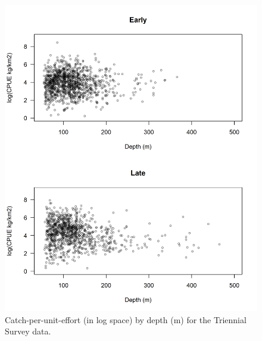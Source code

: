 \documentclass[12pt,]{article}
\begin{document}
\begin{figure}
\centering
\includegraphics{Figures/Tri_CPUE_Depth.png}
\caption{Catch-per-unit-effort (in log space) by depth (m) for the
Triennial Survey data. \label{fig:tri_cpue_depth}}
\end{figure}

\FloatBarrier
\end{document}
